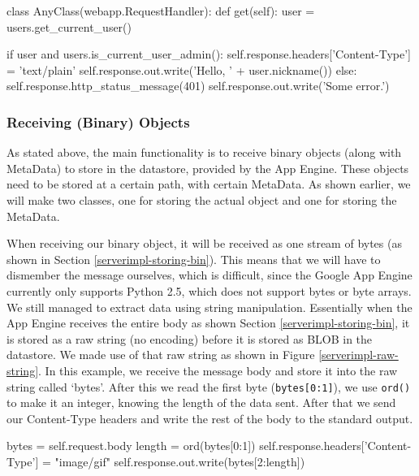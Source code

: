 \begin{figure*}[ht] %
\begin{center}
\begin{code}
class AnyClass(webapp.RequestHandler):
  def get(self):
    user = users.get_current_user()

    if user and users.is_current_user_admin():
      self.response.headers['Content-Type'] = 'text/plain'
      self.response.out.write('Hello, ' + user.nickname())
    else:
      self.response.http_status_message(401)
      self.response.out.write('Some error.')
\end{code}
\caption{A MetaData Object.\label{serverimpl-login}}
\end{center}
\end{figure*}
      
\subsubsection{Receiving (Binary) Objects}
As stated above, the main functionality is to receive binary objects (along with
MetaData) to store in the datastore, provided by the App Engine. These objects
need to be stored at a certain path, with certain MetaData. As shown earlier, we
will make two classes, one for storing the actual object and one for storing the
MetaData.

When receiving our binary object, it will be received as one stream of bytes (as
shown in Section \ref{serverimpl-storing-bin}). This means that we will have to
dismember the message ourselves, which is difficult, since the Google App Engine
currently only supports Python 2.5, which does not support bytes or byte arrays.
We still managed to extract data using string manipulation. Essentially when the
App Engine receives the entire body as shown Section
\ref{serverimpl-storing-bin}, it is stored as a raw string (no encoding) before
it is stored as BLOB in the datastore. We made use of that raw string as shown
in Figure \ref{serverimpl-raw-string}. In this example, we receive the message
body and store it into the raw string called `bytes'. After this we read the
first byte (\texttt{bytes[0:1]}), we use \texttt{ord()} to make it an integer,
knowing the length of the data sent. After that we send our Content-Type headers
and write the rest of the body to the standard output.

\begin{figure*}[ht] %
\begin{center}
\begin{code}
bytes = self.request.body
length = ord(bytes[0:1])
self.response.headers['Content-Type'] = "image/gif"
self.response.out.write(bytes[2:length])
\end{code}
\caption{Manipulating a Raw String.\label{serverimpl-raw-string}}
\end{center}
\end{figure*}

